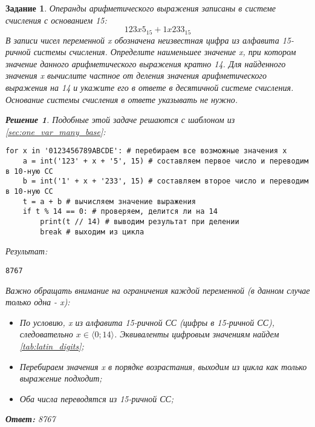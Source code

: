 \documentclass[12pt]{article}
\theoremstyle{problem_style}
\newtheorem{problem}{Задание}[subsection]
\newtheorem{solution}{Решение}[subsection]
\begin{document}
\begin{problem}
Операнды арифметического выражения записаны в системе счисления с основанием 15:
\[123x5_{15} + 1x233_{15}\]
В записи чисел переменной x обозначена неизвестная цифра из алфавита 15-ричной системы счисления. Определите наименьшее значение x, при котором значение данного арифметического выражения кратно 14. Для найденного значения x вычислите частное от деления значения арифметического выражения на 14 и укажите его в ответе в десятичной системе счисления. Основание системы счисления в ответе указывать не нужно.
\begin{solution}
Подобные этой задаче решаются с шаблоном из \autoref{sec:one_var_many_base}:
\begin{verbatim}
for x in '0123456789ABCDE': # перебираем все возможные значения x
    a = int('123' + x + '5', 15) # составляем первое число и переводим в 10-ную СС
    b = int('1' + x + '233', 15) # составляем второе число и переводим в 10-ную СС
    t = a + b # вычисляем значение выражения
    if t % 14 == 0: # проверяем, делится ли на 14
        print(t // 14) # выводим результат при делении
        break # выходим из цикла
\end{verbatim}
Результат:
\begin{verbatim}
8767
\end{verbatim}
Важно обращать внимание на ограничения каждой переменной (в данном случае только одна - x):
\begin{itemize}
    \item По условию, x из алфавита 15-ричной СС (цифры в 15-ричной СС), следовательно $x \in \langle 0; 14 \rangle$. Эквиваленты цифровым значениям найдем \autoref{tab:latin_digits};
    \item Перебираем значения x в порядке возрастания, выходим из цикла как только выражение подходит;
    \item Оба числа переводятся из 15-ричной СС;
\end{itemize}
\textbf{Ответ:} 8767
\end{solution}
\end{problem}
\end{document}
